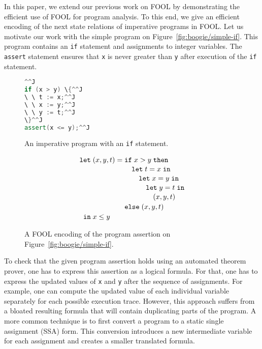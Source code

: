 In this paper, we extend our previous work on FOOL by demonstrating the efficient use of FOOL for program analysis. To this end, we give an efficient encoding of the next state relations of imperative programs in FOOL. Let us motivate our work with the simple program on Figure~\ref{fig:boogie/simple-if}. This program contains an \verb'if' statement and assignments to integer variables. The \lstinline'assert' statement ensures that \lstinline'x' is never greater than \lstinline'y' after execution of the \verb'if' statement.

\begin{figure}
  \parbox{4.7cm}{
    \vspace{2em}\hspace{0.6cm}
    \begin{minipage}{3.2cm}
    \begin{lstlisting}[language=cpp]^^J
if (x > y) \{^^J
\ \ t := x;^^J
\ \ x := y;^^J
\ \ y := t;^^J
\}^^J
assert(x <= y);^^J
    \end{lstlisting}
    \end{minipage}
    \vspace{1.5em}
    \caption{An imperative program with an \texttt{if} statement.}
    \label{fig:boogie/simple-if}
  }
\quad
  \begin{minipage}{6cm}
\[
  \letnl{(x,y,t)}{\itenll{x > y}
                 {\letinnl{t}{x}
                          {\letinnl{x}{y}
                                   {\letinnl{y}{t}
                                            {(x,y,t)}}}}
                 {(x,y,t)}}
        {x \le y}
\]
    \caption{A FOOL encoding of the program assertion on Figure~\ref{fig:boogie/simple-if}.}
    \label{fig:boogie/simple-if-fool}
  \end{minipage}
\end{figure}

To check that the given program assertion holds using an automated theorem prover, one has to express this assertion as a logical formula. For that, one has to express the updated values of \verb'x' and \verb'y' after the sequence of assignments. For example, one can compute the updated value of each individual variable separately for each possible execution trace. However, this approach suffers from a bloated resulting formula that will contain duplicating parts of the program. A more common technique is to first convert a program to a static single assignment (SSA) form. This conversion introduces a new intermediate variable for each assignment and creates a smaller translated formula.

